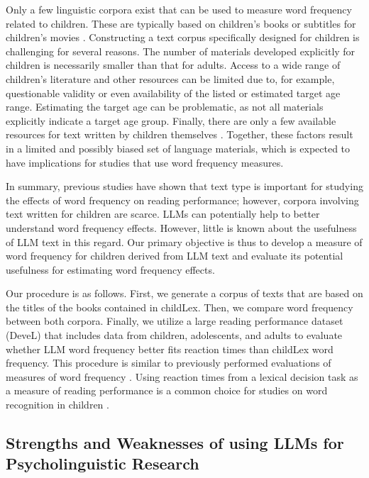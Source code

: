 \documentclass[manuscript]{stjour}
\begin{document}
Only a few linguistic corpora exist that can be used to measure word frequency related to children. These are typically based on children's books or subtitles for children's movies \citep{schroeder_childlex_2015, tellings_basilex_2014, van_heuven_subtlex-uk_2014, Korochkina_2024}. Constructing a text corpus specifically designed for children is challenging for several reasons. The number of materials developed explicitly for children is necessarily smaller than that for adults. Access to a wide range of children's literature and other resources can be limited due to, for example, questionable validity or even availability of the listed or estimated target age range. Estimating the target age can be problematic, as not all materials explicitly indicate a target age group. Finally, there are only a few available resources for text written by children themselves \citep[see, e.g.,][]{laarmann-quante_litkey_2019}. Together, these factors result in a limited and possibly biased set of language materials, which is expected to have implications for studies that use word frequency measures. 

In summary, previous studies have shown that text type is important for studying the effects of word frequency on reading performance; however, corpora involving text written for children are scarce. LLMs can potentially help to better understand word frequency effects. However, little is known about the usefulness of LLM text in this regard. Our primary objective is thus to develop a measure of word frequency for children derived from LLM text and evaluate its potential usefulness for estimating word frequency effects. 

Our procedure is as follows. First, we generate a corpus of texts that are based on the titles of the books contained in childLex. Then, we compare word frequency between both corpora. Finally, we utilize a large reading performance dataset (DeveL) that includes data from children, adolescents, and adults \citep{schroter_developmental_2017} to evaluate whether LLM word frequency better fits reaction times than childLex word frequency. This procedure is similar to previously performed evaluations of measures of word frequency \citep[e.g.,][]{brysbaert_word_2011, brysbaert_word_2018}. Using reaction times from a lexical decision task as a measure of reading performance is a common choice for studies on word recognition in children \citep{davies_reading_2017, monster_word_2022, van_den_boer_lexical_2012}. 


\subsection*{Strengths and Weaknesses of using LLMs for Psycholinguistic Research}
\end{document}
